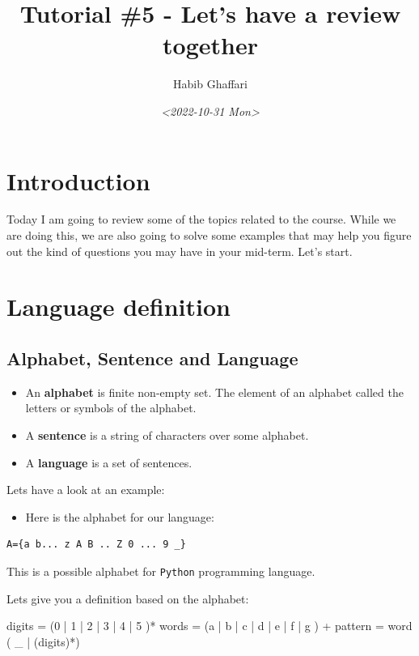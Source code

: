 \documentclass[11pt]{article}
\author{Habib Ghaffari}
\date{\textit{<2022-10-31 Mon>}}
\title{Tutorial \#5 - Let's have a review together}
\begin{document}
\maketitle
\tableofcontents



\section{Introduction}
\label{s1}
Today I am going to review some of the topics related to the course. While we
are doing this, we are also going to solve some examples that may help you
figure out the kind of questions you may have in your mid-term. Let's start.

\section{Language definition}
\label{sec:orgf598a4c}

\subsection{Alphabet, Sentence and Language}
\label{sec:org4609a65}

\begin{itemize}
\item An \textbf{alphabet} is finite non-empty set. The element of an alphabet called the
letters or symbols of the alphabet.
\item A \textbf{sentence} is a string of characters over some alphabet.
\item A \textbf{language} is a set of sentences.
\end{itemize}


Lets have a look at an example:

\begin{itemize}
\item Here is the alphabet for our language:
\end{itemize}

\begin{verbatim}
A={a b... z A B .. Z 0 ... 9 _}
\end{verbatim}

This is a possible alphabet for \texttt{Python} programming language.

Lets give you a definition based on the alphabet:

digits = (0 | 1 | 2 | 3 | 4 | 5 )*
words = (a | b | c | d | e | f | g ) +
pattern =  word ( \_ | (digits)*)
\end{document}
